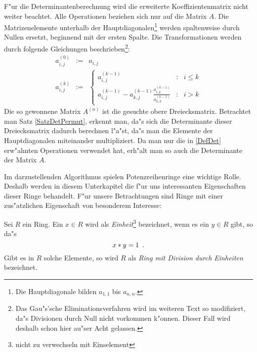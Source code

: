 F"ur die Determinantenberechnung wird die erweiterte Koeffizientenmatrix
nicht weiter beachtet. Alle Operationen beziehen sich nur auf die Matrix
$A$. Die Matrizenelemente unterhalb der
Hauptdiagonalen\footnote{ Die Hauptdiagonale bilden $a_{1,1}$ bis
$a_{n,n}$.} werden spaltenweise durch Nullen ersetzt, beginnend mit der
ersten Spalte. Die Transformationen werden durch folgende Gleichungen
beschrieben\footnote{ Das Gau"s'sche Eliminationsverfahren wird im
weiteren Text so modifiziert, da"s Divisionen durch Null nicht
vorkommen k"onnen. Dieser Fall wird deshalb schon hier au"ser Acht
gelassen.}:
\begin{eqnarray}
    \label{Equ1GaussDef}
    a_{i,j}^{(0)} & := & a_{i,j}
\\  \label{Equ2GaussDef}
    a_{i,j}^{(k)} & := & \left\{
                            \begin{array}{lcr}
                                a_{i,j}^{(k-1)} & : & i \leq k
                            \\  a_{i,j}^{(k-1)}-a_{k,j}^{(k-1)}
                                    \frac{ a_{i,k}^{(k-1)} }{
                                           a_{k,k}^{(k-1)}  }
                                               & : & i > k
                            \end{array}
                        \right.
\end{eqnarray}
Die so gewonnene Matrix $A^{(n)}$ ist die gesuchte obere Dreiecksmatrix.
Betrachtet man Satz \ref{SatzDetPermut}, erkennt man, da"s sich die
Determinante dieser Dreiecksmatrix dadurch berechnen l"a"st, da"s man
die Elemente der Hauptdiagonalen miteinander multipliziert. Da man nur
die in \ref{DefDet} erw"ahnten Operationen verwendet hat, erh"alt man so
auch die Determinante der Matrix $A$.


\label{SecPotRing}

Im darzustellenden Algorithmus spielen Potenzreihenringe eine wichtige
Rolle. Deshalb werden in diesem Unterkapitel die f"ur uns interessanten
Eigenschaften dieser Ringe behandelt. F"ur unsere Betrachtungen sind Ringe
mit einer zus"atzlichen Eigenschaft von besonderem Interesse:

\MyBeginDef
\label{DefEinheit}
    Sei $R$ ein Ring. Ein $x \in R$ wird als 
    {\em Einheit}\footnote{nicht zu verwechseln mit Einselement}
    bezeichnet, wenn es ein $y \in R$ gibt, so da"s
    \[ x * y = 1 \mbox{\hspace{0.5em}.} \] Gibt es in $R$ solche Elemente, so wird $R$ 
    als { \em Ring mit Division durch Einheiten } bezeichnet. 
\MyEndDef

